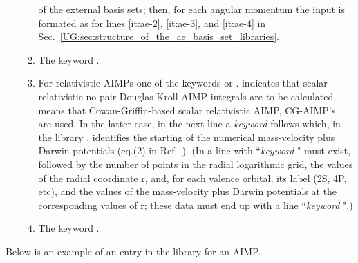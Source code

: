 \begin{enumerate}
\begin{enumerate}
of the external basis sets; then, for each angular momentum the input is
formated as for lines
\ref{it:ae-2}, \ref{it:ae-3}, and \ref{it:ae-4} 
in Sec.~\ref{UG:sec:structure_of_the_ae_basis_set_libraries}.
\item The keyword .
\item For relativistic AIMPs one of the keywords  or .
 indicates that scalar relativistic no-pair Douglas-Kroll AIMP integrals are to be calculated.
 means that Cowan-Griffin-based scalar relativistic AIMP, CG-AIMP's, are used.
In the latter case, in the next line a {\it keyword} follows which, in the library ,
identifies
the starting of the numerical mass-velocity plus Darwin potentials
(eq.(2) in Ref.~\cite{Barandiaran:90}).
(In  a line with
``{\it keyword} " must
exist, followed by the number of points in the radial logarithmic
grid, the values of the radial coordinate r, and,
for each valence orbital, its label (2S, 4P, etc),
and the values of the mass-velocity plus Darwin potentials
at the corresponding values of r; these data must end up with
a line
``{\it keyword} ".)                 
\item The keyword .
\end{enumerate}
\end{enumerate}
 
\noindent
 
Below is an example of an entry in the  library for an AIMP.
\vskip 0.2cm
 

